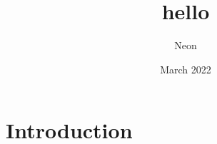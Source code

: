 \documentclass{article}
\title{hello}
\author{Neon }
\date{March 2022}
\begin{document}
\maketitle

\section{Introduction}
\end{document}
